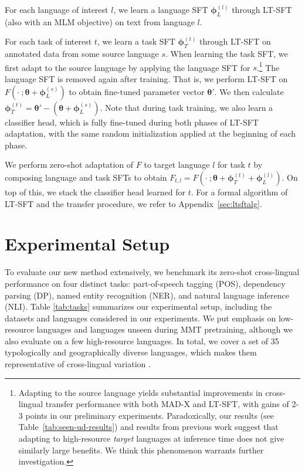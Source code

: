 For each language of interest $l$, we learn a language SFT $\bm{\phi}_L^{(l)}$ through LT-SFT (also with an MLM objective) on text from language $l$.

For each task of interest $t$, we learn a task SFT $\bm{\phi}_T^{(t)}$ through LT-SFT on annotated data from some source language $s$. When learning the task SFT, we first adapt to the source language by applying the language SFT for $s$.\footnote{Adapting to the source language yields substantial improvements in cross-lingual transfer performance with both MAD-X and LT-SFT, with gains of 2-3 points in our preliminary experiments. Paradoxically, our results (see Table~\ref{tab:seen-ud-results}) and results from previous work \citep{pfeiffer-etal-2020-mad,ansell-etal-2021-mad-g} suggest that adapting to high-resource \textit{target} languages at inference time does not give similarly large benefits. We think this phenomenon warrants further investigation.} The language SFT is removed again after training. That is, we perform LT-SFT on $F(\cdot\ ; \bm{\theta} + \bm{\phi}_L^{(s)})$ to obtain fine-tuned parameter vector $\bm{\theta}'$. We then calculate $\bm{\phi}_T^{(t)} = \bm{\theta}' - (\bm{\theta} + \bm{\phi}_L^{(s)})$. Note that during task training, we also learn a classifier head, which is fully fine-tuned during both phases of LT-SFT adaptation, with the same random initialization applied at the beginning of each phase.

We perform zero-shot adaptation of $F$ to target language $l$ for task $t$ by composing language and task SFTs to obtain $F_{t,l} = F(\cdot\ ; \bm{\theta} + \bm{\phi}_T^{(t)} + \bm{\phi}_L^{(l)})$. On top of this, we stack the classifier head learned for $t$. For a formal algorithm of LT-SFT and the transfer procedure, we refer to Appendix~\ref{sec:ltsftalg}.

\section{Experimental Setup}

To evaluate our new method extensively, we benchmark its zero-shot cross-lingual performance on four distinct tasks: part-of-speech tagging (POS), dependency parsing (DP), named entity recognition (NER), and natural language inference (NLI). Table \ref{tab:tasks} summarizes our experimental setup, including the datasets and languages considered in our experiments. We put emphasis on low-resource languages and languages unseen during MMT pretraining, although we also evaluate on a few high-resource languages. In total, we cover a set of 35 typologically and geographically diverse languages, which makes them representative of cross-lingual variation \citep{ponti-etal-2019-modeling,ponti-etal-2020-xcopa}.

